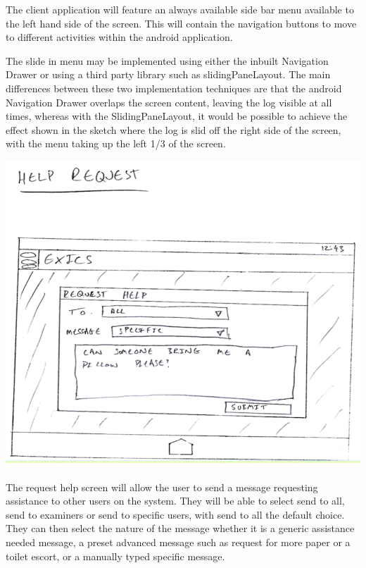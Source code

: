 The client application will feature an always available side bar menu available to the left hand side of the screen.  This will contain the navigation buttons to move to different activities within the android application.

The slide in menu may be implemented using either the inbuilt Navigation Drawer\cite{navdrawer} or using a third party library such as slidingPaneLayout\cite{spl}.  The main differences between these two implementation techniques are that the android Navigation Drawer overlaps the screen content, leaving the log visible at all times, whereas with the SlidingPaneLayout, it would be possible to achieve the effect shown in the sketch where the log is slid off the right side of the screen, with the menu taking up the left 1/3 of the screen.

\includegraphics[width=\textwidth]{"GUI Sketches/Help Request Window Cropped"}

The request help screen will allow the user to send a message requesting assistance to other users on the system.  They will be able to select send to all, send to examiners or send to specific users, with send to all the default choice.  They can then select the nature of the message whether it is a generic assistance needed message, a preset advanced message such as request for more paper or a toilet escort, or a manually typed specific message.

